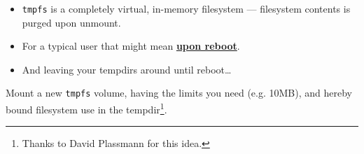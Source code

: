 \begin{frame}


\begin{itemize}

\item \texttt{tmpfs} is a completely virtual, in-memory filesystem ---
filesystem contents is purged upon unmount.

\end{itemize}

\pause

\vspace{\fill}


\begin{itemize}

\item For a typical user that might mean \underline{\textbf{upon reboot}}.

\item And leaving your tempdirs around until reboot\ldots

\end{itemize}

\end{frame}


\begin{frame}


\begin{center}

Mount a new \texttt{tmpfs} volume, having the limits you need (e.g. 10MB), and
hereby bound filesystem use in the tempdir\footnote{Thanks to David Plassmann
for this idea.}.

\end{center}

\end{frame}


\begin{frame}


\begin{itemize}

\end{itemize}

\end{frame}
